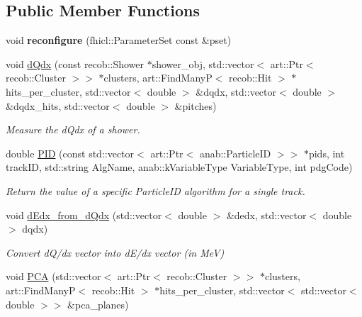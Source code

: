 \subsection*{Public Member Functions}
\begin{DoxyCompactItemize}
\item 
\hypertarget{classlee_1_1EnergyHelper_aa551642488e1a71f7b3d16965789a9f7}{void {\bfseries reconfigure} (fhicl\-::\-Parameter\-Set const \&pset)}\label{classlee_1_1EnergyHelper_aa551642488e1a71f7b3d16965789a9f7}

\item 
void \hyperlink{classlee_1_1EnergyHelper_a4a3122ca6339e77bb3524fd1762a1f69}{d\-Qdx} (const recob\-::\-Shower $\ast$shower\-\_\-obj, std\-::vector$<$ art\-::\-Ptr$<$ recob\-::\-Cluster $>$$>$ $\ast$clusters, art\-::\-Find\-Many\-P$<$ recob\-::\-Hit $>$ $\ast$hits\-\_\-per\-\_\-cluster, std\-::vector$<$ double $>$ \&dqdx, std\-::vector$<$ double $>$ \&dqdx\-\_\-hits, std\-::vector$<$ double $>$ \&pitches)
\begin{DoxyCompactList}\small\item\em Measure the d\-Qdx of a shower. \end{DoxyCompactList}\item 
double \hyperlink{classlee_1_1EnergyHelper_a7731238e9b8545a22c3aa456025470bd}{P\-I\-D} (const std\-::vector$<$ art\-::\-Ptr$<$ anab\-::\-Particle\-I\-D $>$$>$ $\ast$pids, int track\-I\-D, std\-::string Alg\-Name, anab\-::k\-Variable\-Type Variable\-Type, int pdg\-Code)
\begin{DoxyCompactList}\small\item\em Return the value of a specific Particle\-I\-D algorithm for a single track. \end{DoxyCompactList}\item 
void \hyperlink{classlee_1_1EnergyHelper_a54bc53c792be860c9b9eac24b6cc6729}{d\-Edx\-\_\-from\-\_\-d\-Qdx} (std\-::vector$<$ double $>$ \&dedx, std\-::vector$<$ double $>$ dqdx)
\begin{DoxyCompactList}\small\item\em Convert d\-Q/dx vector into d\-E/dx vector (in Me\-V) \end{DoxyCompactList}\item 
void \hyperlink{classlee_1_1EnergyHelper_a75cf4cee4e6db93d52022be00eb86302}{P\-C\-A} (std\-::vector$<$ art\-::\-Ptr$<$ recob\-::\-Cluster $>$$>$ $\ast$clusters, art\-::\-Find\-Many\-P$<$ recob\-::\-Hit $>$ $\ast$hits\-\_\-per\-\_\-cluster, std\-::vector$<$ std\-::vector$<$ double $>$$>$ \&pca\-\_\-planes)

\end{DoxyCompactItemize}
